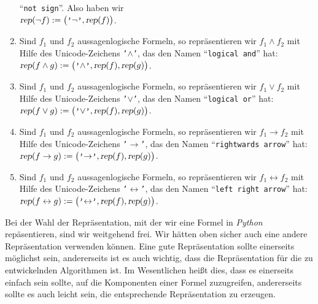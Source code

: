 \begin{enumerate}
      ``\texttt{not sign}''.  Also haben wir
      \\[0.2cm]
      \hspace*{1.3cm} 
      $\textsl{rep}(\neg f) := \bigl(\texttt{'$\neg$'}, \textsl{rep}(f)\bigr)$.
\item Sind $f_1$ und $f_2$ aussagenlogische Formeln, so repräsentieren wir $f_1 \wedge f_2$ mit
      Hilfe des Unicode-Zeichens  \texttt{'$\wedge$'}, das den Namen 
      ``\texttt{logical and}'' hat:
      \\[0.2cm]
      \hspace*{1.3cm} 
      $\textsl{rep}(f \wedge g) := \bigl(\texttt{'$\wedge$'}, \textsl{rep}(f), \textsl{rep}(g)\bigr)$.
\item Sind $f_1$ und $f_2$ aussagenlogische Formeln, so repräsentieren wir $f_1 \vee f_2$ mit
      Hilfe des Unicode-Zeichens  \texttt{'$\vee$'}, das den Namen ``\texttt{logical or}'' hat:
      \\[0.2cm]
      \hspace*{1.3cm} 
      $\textsl{rep}(f \vee g) := \bigl(\texttt{'$\vee$'}, \textsl{rep}(f), \textsl{rep}(g)\bigr)$.
\item Sind $f_1$ und $f_2$ aussagenlogische Formeln, so repräsentieren wir $f_1 \rightarrow f_2$ mit
      Hilfe des Unicode-Zeichens  \texttt{'$\rightarrow$'}, das den Namen ``\texttt{rightwards arrow}'' hat:
      \\[0.2cm]
      \hspace*{1.3cm} 
      $\textsl{rep}(f \rightarrow g) := \bigl(\texttt{'$\rightarrow$'}, \textsl{rep}(f), \textsl{rep}(g)\bigr)$.
\item Sind $f_1$ und $f_2$ aussagenlogische Formeln, so repräsentieren wir $f_1 \leftrightarrow f_2$ mit
      Hilfe des Unicode-Zeichens  \texttt{'$\leftrightarrow$'}, das den Namen ``\texttt{left right arrow}'' hat:
      \\[0.2cm]
      \hspace*{1.3cm} 
      $\textsl{rep}(f \leftrightarrow g) := \bigl(\texttt{'$\leftrightarrow$'}, \textsl{rep}(f), \textsl{rep}(g)\bigr)$.
\end{enumerate}
Bei der Wahl der Repräsentation, mit der wir eine Formel in \textsl{Python} repäsentieren,
sind wir weitgehend frei.  Wir hätten oben sicher auch eine andere Repräsentation
verwenden können.  Eine gute Repräsentation sollte einerseits möglichst  sein, andererseits ist
es auch wichtig, dass die Repräsentation für die zu entwickelnden Algorithmen 
ist.  Im Wesentlichen heißt dies, dass es einerseits einfach sein sollte, auf
die Komponenten einer Formel zuzugreifen, andererseits sollte es auch leicht sein,
die entsprechende Repräsentation zu erzeugen.

